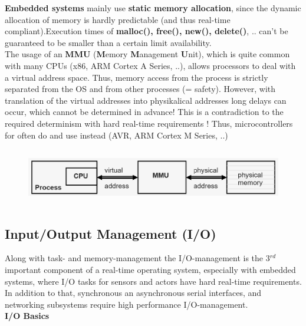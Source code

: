 \textbf{Embedded systems} mainly use \textbf{static memory allocation}, since the dynamic allocation of memory is hardly predictable (and thus real-time compliant).Execution times of \textbf{malloc(), free(), new(), delete()}, .. can't be guaranteed to be smaller than a certain limit  availability.\\

The usage of an \textbf{MMU} (\textbf{M}emory \textbf{M}anagement \textbf{U}nit), which is quite common with many CPUs (x86, ARM Cortex A Series, ..), allows processors to deal with a virtual address space. Thus, memory access from the process is strictly separated from the OS and from other processes (= safety). However, with translation of the virtual addresses into physikalical addresses long delays can occur, which cannot be determined in advance! This is a contradiction to the required determinism with hard real-time requirements ! Thus, microcontrollers for  often do \textbf{} and use  instead (AVR, ARM Cortex M Series, ..) 

 	\begin{figure}[h]
    \centering
    \includegraphics[width=12cm, height=2.5cm]{Images/image119.png}
    \label{fig:Fig }
    \end{figure}
    
\subsection{  Input/Output Management (I/O)}

Along with task- and memory-management the\textbf{ }I/O-management is the 3${}^{rd}$  important component of a real-time operating system, especially with embedded systems, where I/O tasks for sensors and actors have hard real-time requirements.\\

In addition to that, synchronous an asynchronous serial interfaces, and networking subsystems require high performance I/O-management.\\

{\rot\bf I/O Basics}\\

